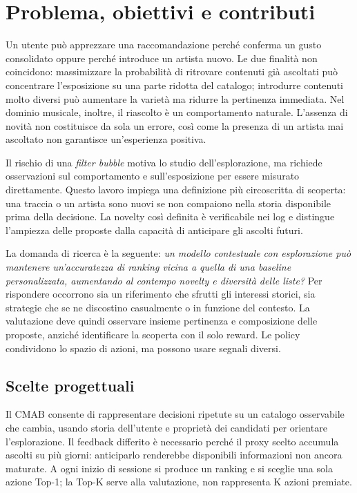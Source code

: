 \chapter{Problema, obiettivi e contributi}\label{ch:intro}
Un utente può apprezzare una raccomandazione perché conferma un gusto consolidato oppure perché introduce un artista nuovo. Le due finalità non coincidono: massimizzare la probabilità di ritrovare contenuti già ascoltati può concentrare l'esposizione su una parte ridotta del catalogo; introdurre contenuti molto diversi può aumentare la varietà ma ridurre la pertinenza immediata. Nel dominio musicale, inoltre, il riascolto è un comportamento naturale. L'assenza di novità non costituisce da sola un errore, così come la presenza di un artista mai ascoltato non garantisce un'esperienza positiva.

Il rischio di una \emph{filter bubble} motiva lo studio dell'esplorazione, ma richiede osservazioni sul comportamento e sull'esposizione per essere misurato direttamente. Questo lavoro impiega una definizione più circoscritta di scoperta: una traccia o un artista sono nuovi se non compaiono nella storia disponibile prima della decisione. La novelty così definita è verificabile nei log e distingue l'ampiezza delle proposte dalla capacità di anticipare gli ascolti futuri.

La domanda di ricerca è la seguente: \emph{un modello contestuale con esplorazione può mantenere un'accuratezza di ranking vicina a quella di una baseline personalizzata, aumentando al contempo novelty e diversità delle liste?} Per rispondere occorrono sia un riferimento che sfrutti gli interessi storici, sia strategie che se ne discostino casualmente o in funzione del contesto. La valutazione deve quindi osservare insieme pertinenza e composizione delle proposte, anziché identificare la scoperta con il solo reward. Le policy condividono lo spazio di azioni, ma possono usare segnali diversi.

\section{Scelte progettuali}
Il CMAB consente di rappresentare decisioni ripetute su un catalogo osservabile che cambia, usando storia dell'utente e proprietà dei candidati per orientare l'esplorazione. Il feedback differito è necessario perché il proxy scelto accumula ascolti su più giorni: anticiparlo renderebbe disponibili informazioni non ancora maturate. A ogni inizio di sessione si produce un ranking e si sceglie una sola azione Top-1; la Top-K serve alla valutazione, non rappresenta K azioni premiate.

